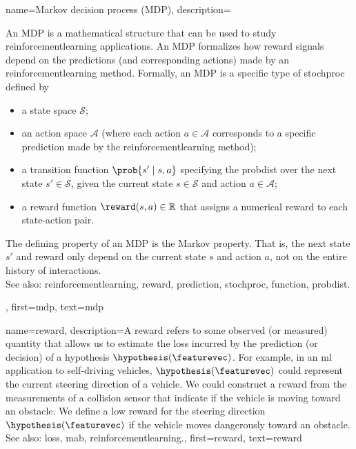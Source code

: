 {name={Markov decision process (MDP)},
	description={An MDP  is a mathematical structure that can 
    		be used to study \gls{reinforcementlearning} applications. An MDP formalizes how \gls{reward} 
		signals depend on the \glspl{prediction} (and corresponding actions) made by an \gls{reinforcementlearning} 
		method. Formally, an MDP is a specific type of \gls{stochproc} defined by
		\begin{itemize}
    			\item a state space $\mathcal{S}$;
    			\item an action space $\mathcal{A}$ (where each action $a \in \mathcal{A}$ corresponds to a specific 
			\gls{prediction} made by the \gls{reinforcementlearning} method);
    			\item a transition \gls{function} $\prob{s' \mid s, a}$ specifying the \gls{probdist} over the 
			next state $s' \in \mathcal{S}$, given the current state $s \in \mathcal{S}$ and action $a \in \mathcal{A}$;
    			\item a \gls{reward} \gls{function} $\reward(s, a) \in \mathbb{R}$ that assigns a numerical \gls{reward} to each 
			state-action pair.
		\end{itemize}
		The defining property of an MDP is the Markov property. That is, the next state $s'$ and \gls{reward} 
		only depend on the current state $s$ and action $a$, not on the entire history of interactions. 
		\\
		See also: \gls{reinforcementlearning}, \gls{reward}, \gls{prediction}, \gls{stochproc}, \gls{function}, \gls{probdist}.},
 	first={mdp},
 	text={mdp} 
 }
 

{name={reward}, 
	description={A reward refers to some observed 
		(or measured) quantity that allows us to estimate the \gls{loss} incurred by the \gls{prediction} 
		(or decision) of a \gls{hypothesis} $\hypothesis(\featurevec)$. For example, in an 
		\gls{ml} application to self-driving vehicles, $\hypothesis(\featurevec)$ could represent 
		the current steering direction of a vehicle. We could construct a reward from the 
		measurements of a collision sensor that indicate if the vehicle is moving toward 
		an obstacle. We define a low reward for the steering direction 
		$\hypothesis(\featurevec)$ if the vehicle moves dangerously toward an obstacle.
			\\
		See also: \gls{loss}, \gls{mab}, \gls{reinforcementlearning}.},
	first={reward}, 
	text={reward}
} 

